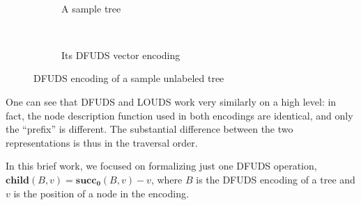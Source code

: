 \documentclass[11pt]{article}
\begin{document}
\begin{figure}
\begin{subfigure}[t]{0.1\textwidth}
  \centering
\end{subfigure}
\begin{subfigure}[t]{0.44\textwidth}
  \centering
   \\
  \caption{A sample tree}
  \label{fig:a_sample_tree}
\end{subfigure}
\begin{subfigure}[t]{0.44\textwidth}
  \centering
   \\
  \caption{Its DFUDS vector encoding}
\end{subfigure}
\caption{DFUDS encoding of a sample unlabeled tree}
\label{fig:louds}
\end{figure}

One can see that DFUDS and LOUDS work very similarly on a high level: in fact, the node description
function used in both encodings are identical, and only the ``prefix'' is different. The substantial
difference between the two representations is thus in the traversal order.

In this brief work, we focused on formalizing just one DFUDS operation, $\mathbf{child}(B, v) =
\mathbf{succ_0}(B, v) - v$, where $B$ is the DFUDS encoding of a tree and $v$ is the position of a node
in the encoding.
\end{document}
